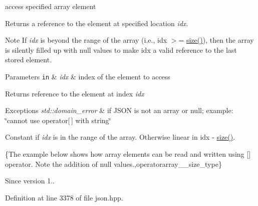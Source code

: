 access specified array element 

Returns a reference to the element at specified location {\itshape idx}.

\begin{DoxyNote}{Note}
If {\itshape idx} is beyond the range of the array (i.\+e., {\ttfamily idx $>$= \hyperlink{classnlohmann_1_1basic__json_a01833b332b68d9af1f7cd7a816c39e49}{size()}}), then the array is silently filled up with {\ttfamily null} values to make {\ttfamily idx} a valid reference to the last stored element.
\end{DoxyNote}

\begin{DoxyParams}[1]{Parameters}
\mbox{\tt in}  & {\em idx} & index of the element to access\\
\hline
\end{DoxyParams}
\begin{DoxyReturn}{Returns}
reference to the element at index {\itshape idx} 
\end{DoxyReturn}

\begin{DoxyExceptions}{Exceptions}
{\em std\+::domain\+\_\+error} & if J\+S\+O\+N is not an array or null; example\+: {\ttfamily \char`\"{}cannot use operator\mbox{[}$\,$\mbox{]} with string\char`\"{}}\\
\hline
\end{DoxyExceptions}
Constant if {\itshape idx} is in the range of the array. Otherwise linear in {\ttfamily idx -\/ \hyperlink{classnlohmann_1_1basic__json_a01833b332b68d9af1f7cd7a816c39e49}{size()}}.

\{The example below shows how array elements can be read and written using {\ttfamily \mbox{[}\mbox{]}} operator. Note the addition of {\ttfamily null} values.,operatorarray\+\_\+\+\_\+size\+\_\+type\}

\begin{DoxySince}{Since}
version 1.. 
\end{DoxySince}


Definition at line 3378 of file json.\+hpp.

\hypertarget{classnlohmann_1_1basic__json_a99f2e765029e51dd0fff018650f92eea}{}
